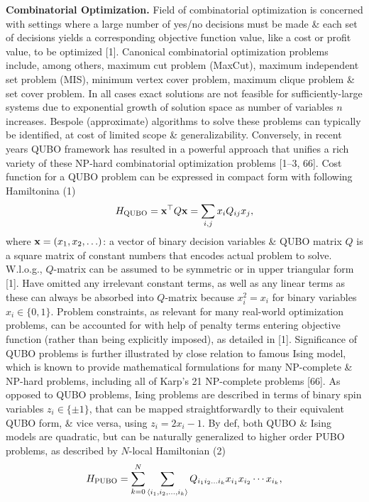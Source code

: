 \documentclass{article}
\begin{document}
\begin{itemize}
    {\bf Combinatorial Optimization.} Field of combinatorial optimization is concerned with settings where a large number of yes/no decisions must be made \& each set of decisions yields a corresponding objective function value, like a cost or profit value, to be optimized [1]. Canonical combinatorial optimization problems include, among others, maximum cut problem (MaxCut), maximum independent set problem (MIS), minimum vertex cover problem, maximum clique problem \& set cover problem. In all cases exact solutions are not feasible for sufficiently-large systems due to exponential growth of solution space as number of variables $n$ increases. Bespole (approximate) algorithms to solve these problems can typically be identified, at cost of limited scope \& generalizability. Conversely, in recent years QUBO framework has resulted in a powerful approach that unifies a rich variety of these NP-hard combinatorial optimization problems [1--3, 66]. Cost function for a QUBO problem can be expressed in compact form with following Hamiltonina (1)
    \begin{equation*}
        H_{\rm QUBO} = {\bf x}^\top Q{\bf x} = \sum_{i,j} x_iQ_{ij}x_j,
    \end{equation*}
    where ${\bf x} = (x_1,x_2,\ldots)$: a vector of binary decision variables \& QUBO matrix $Q$ is a square matrix of constant numbers that encodes actual problem to solve. W.l.o.g., $Q$-matrix can be assumed to be symmetric or in upper triangular form [1]. Have omitted any irrelevant constant terms, as well as any linear terms as these can always be absorbed into $Q$-matrix because $x_i^2 = x_i$ for binary variables $x_i\in\{0,1\}$. Problem constraints, as relevant for many real-world optimization problems, can be accounted for with help of penalty terms entering objective function (rather than being explicitly imposed), as detailed in [1]. Significance of QUBO problems is further illustrated by close relation to famous Ising model, which is known to provide mathematical formulations for many NP-complete \& NP-hard problems, including all of Karp's 21 NP-complete problems [66]. As opposed to QUBO problems, Ising problems are described in terms of binary spin variables $z_i\in\{\pm1\}$, that can be mapped straightforwardly to their equivalent QUBO form, \& vice versa, using $z_i = 2x_i - 1$. By def, both QUBO \& Ising models are quadratic, but can be naturally generalized to higher order PUBO problems, as described by $N$-local Hamiltonian (2)
    \begin{equation*}
        H_{\rm PUBO} = \sum_{k=0}^N\sum_{\langle i_1,i_2,\ldots,i_k\rangle} Q_{i_1i_2\ldots i_k}x_{i_1}x_{i_2}\cdots x_{i_k},

\end{equation*}
\end{itemize}
\end{document}
